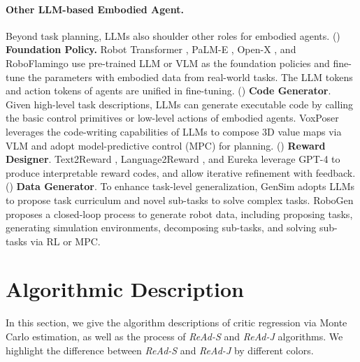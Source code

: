 \documentclass[11pt]{article}
\theoremstyle{plain}
\theoremstyle{remark}
\begin{document}
\paragraph{Other LLM-based Embodied Agent.} 
Beyond task planning, LLMs also shoulder other roles for embodied agents. 
() \textbf{Foundation Policy.} Robot Transformer \citep{RT-1,RT-2}, PaLM-E \citep{palm-e}, Open-X \citep{Open-X}, and RoboFlamingo \citep{OpenFlamingo} use pre-trained LLM or VLM as the foundation policies and fine-tune the parameters with embodied data from real-world tasks. The LLM tokens and action tokens of agents are unified in fine-tuning. () \textbf{Code Generator}. Given high-level task descriptions, LLMs can generate executable code by calling the basic control primitives \citep{Jacky2023Code,vemprala2023gpt4robot} or low-level actions \citep{Yen2023Walk} of embodied agents. VoxPoser \citep{voxposer} leverages the code-writing capabilities of LLMs to compose 3D value maps via VLM and adopt model-predictive control (MPC) for planning. () \textbf{Reward Designer}. Text2Reward \citep{Text2Reward}, Language2Reward \citep{Lan2Rew}, and Eureka \citep{Eureka} leverage GPT-4 to produce interpretable reward codes, and allow iterative refinement with feedback. () \textbf{Data Generator}. To enhance task-level generalization, GenSim \citep{Gensim} adopts LLMs to propose task curriculum and novel sub-tasks to solve complex tasks. RoboGen \citep{RoboGen} proposes a closed-loop process to generate robot data, including proposing tasks, generating simulation environments, decomposing sub-tasks, and solving sub-tasks via RL or MPC.


\section{Algorithmic Description} \label{appendix:alg}

In this section, we give the algorithm descriptions of critic regression via Monte Carlo estimation, as well as the process of \emph{ReAd-S} and \emph{ReAd-J} algorithms. We highlight the difference between \emph{ReAd-S} and \emph{ReAd-J} by different colors. 

\vspace{2em}
\end{document}
